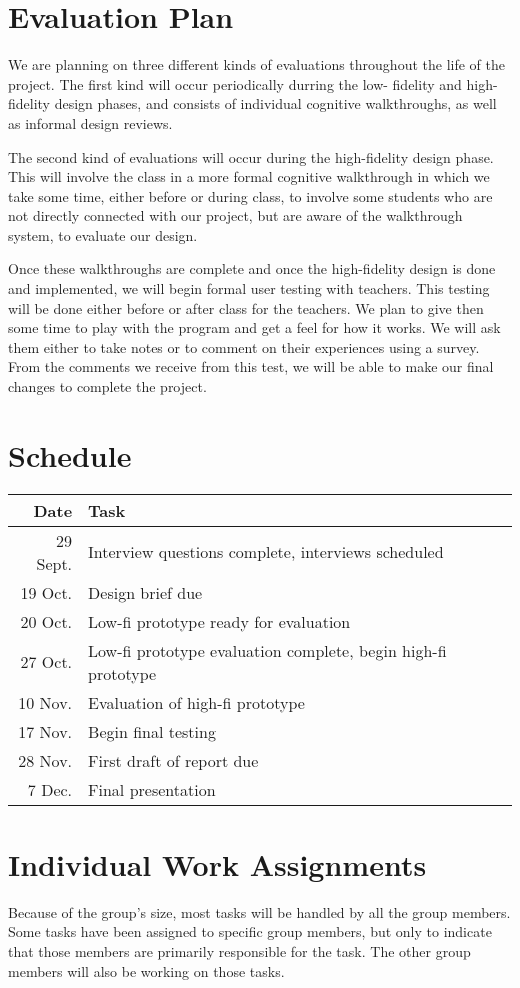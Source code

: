 \documentclass[11pt,letter]{article}
\begin{document}
\section{Evaluation Plan}
We are planning on three different kinds of evaluations throughout the life
of the project.  The first kind will occur periodically durring the low-%
fidelity and high-fidelity design phases, and consists of individual
cognitive walkthroughs, as well as informal design reviews.

The second kind of evaluations will occur during the high-fidelity design phase.
This will involve the class in a more formal cognitive walkthrough in which
we take some time, either before or during class, to involve some students who
are not directly connected with our project, but are aware of the walkthrough
system, to evaluate our design.

Once these walkthroughs are complete and once the high-fidelity design is
done and implemented, we will begin formal user testing with teachers.  This
testing will be done either before or after class for the teachers.  We plan
to give then some time to play with the program and get a feel for how it works.
We will ask them either to take notes or to comment on their experiences using
a survey.  From the comments we receive from this test, we will be able to
make our final changes to complete the project.

\section{Schedule}
\begin{tabular}[!h]{rl}
	\textbf{Date} & \textbf{Task} \\
	\hline
	29 Sept. & Interview questions complete, interviews scheduled \\
	19 Oct.  & Design brief due \\
	20 Oct.  & Low-fi prototype ready for evaluation \\
	27 Oct.  & Low-fi prototype evaluation complete, begin high-fi prototype \\
	10 Nov.  & Evaluation of high-fi prototype \\
	17 Nov.  & Begin final testing \\
	28 Nov.  & First draft of report due \\
	7 Dec.   & Final presentation
\end{tabular}

\section{Individual Work Assignments}
Because of the group's size, most tasks will be handled by all the group
members. Some tasks have been assigned to specific group members, but only to
indicate that those members are primarily responsible for the task. The other
group members will also be working on those tasks.
\end{document}
